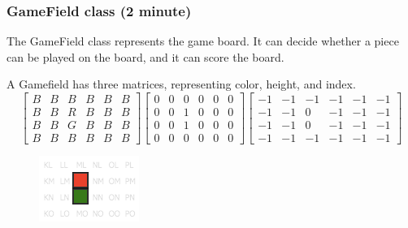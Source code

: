 \documentclass{beamer}
\begin{document}
\begin{frame}
\frametitle{GameField class (2 minute)}
The GameField class represents the game board. It can decide whether a piece can be played on the board, and it can score the board.

A Gamefield has three matrices, representing color, height, and index.
\tiny\[
  \begin{bmatrix}
    B & B & B & B & B & B \\ 
    B & B & R & B & B & B \\ 
    B & B & G & B & B & B \\ 
    B & B & B & B & B & B
  \end{bmatrix}
  \begin{bmatrix}
    0 & 0 & 0 & 0 & 0 & 0 \\ 
    0 & 0 & 1 & 0 & 0 & 0 \\ 
    0 & 0 & 1 & 0 & 0 & 0 \\ 
    0 & 0 & 0 & 0 & 0 & 0
  \end{bmatrix}
  \begin{bmatrix}
    -1 & -1 & -1 & -1 & -1 & -1 \\ 
    -1 & -1 &  0 & -1 & -1 & -1 \\ 
    -1 & -1 &  0 & -1 & -1 & -1 \\ 
    -1 & -1 & -1 & -1 & -1 & -1
  \end{bmatrix}
\]
\begin{figure}
\includegraphics[width=0.4\linewidth]{0}
\end{figure}
\end{frame}
\end{document}
